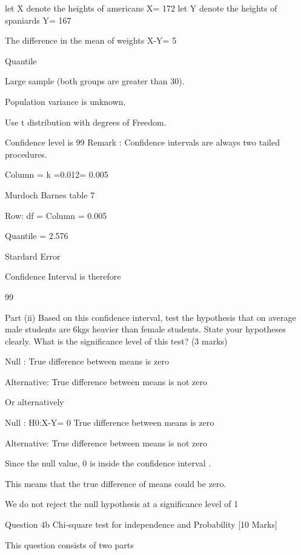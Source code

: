 let X denote the heights of americans    X= 172
let Y denote the heights of spaniards     Y= 167
 
The difference in the mean of weights X-Y= 5
 
Quantile
 
Large sample (both groups are greater than 30).
 
Population variance is unknown.
 
Use t distribution with  degrees of Freedom.
 
 
Confidence level is 99%
Remark : Confidence intervals are always two tailed procedures.
 
 
Column = k =0.012= 0.005

 
Murdoch Barnes table 7

 
	Row: df =  
	Column = 0.005
 
    Quantile =  2.576 
 
 
Stardard Error
  
 

 
 

  
Confidence Interval is therefore
 
99%
 
 
Part (ii)
Based on this confidence interval, test the hypothesis that on average male students are 6kgs heavier than female students.
State your hypotheses clearly. What is the significance level of this test?   (3 marks)
 
 
Null :                 True difference between means is zero
 
Alternative:         True difference between means is not zero
 
Or alternatively
 
Null :              H0:X-Y= 0   True difference between means is zero
 
Alternative:         True difference between means is not zero
 
 
 
Since the null value, 0 is inside the confidence interval  .
 
This means that the true difference of means could be zero.
 
We do not reject the null hypothesis at a significance level of 1%
 
 
Question 4b  
Chi-square test for independence and Probability [10 Marks]

This question consists of two parts
    
